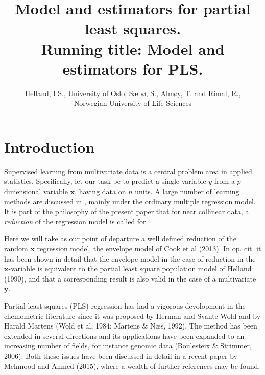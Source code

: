 \documentclass[11pt]{article}
\begin{document}
\title{Model and estimators for partial least squares.\\
  Running title: Model and estimators for PLS.}

\author{Helland, I.S., University of Oslo,  S\ae b\o , S., Alm\o y, T.  and Rimal, R.,\\
Norwegian University of Life Sciences}

\maketitle

\begin{abstract}

\end{abstract}

\onehalfspacing
\section{Introduction}

Supervised learning from multivariate data is a central problem area in applied statistics. Specifically, let our task be to predict a single variable $y$ from a $p$-dimensional  variable $\bm{x}$, having data on $n$ units. A large number of learning methods are discussed in \citet{hastie2009elements}, mainly under the ordinary multiple regression model. It is part of the philosophy of the present paper that for near collinear data, a \emph{reduction} of the regression model is called for.

Here we will take as our point of departure a well defined reduction of the random $\bm{x}$ regression model, the envelope model of \citet{cook2013envelopes} Cook et al (2013). In op. cit. it has been shown in detail that the envelope model in the case of reduction in the $\bm{x}$-variable is equivalent to the partial least square population model of \citet{helland1990partial} Helland (1990), and that a corresponding result is also valid in the case of a multivariate $\bm{y}$. 

Partial least squares (PLS) regression has had a vigorous devolopment in the chemometric literature since it was proposed by  Herman and Svante Wold and by Harald Martens \citep{wold1984collinearity, martens1992multivariate} (Wold et al, 1984; Martens \& N\ae s, 1992). The method has been extended in several directions and its applications have been expanded to an increasing number of fields, for instance genomic data (Boulesteix \& Strimmer, 2006). Both these issues have been discussed in detail in a recent paper by Mehmood and Ahmed (2015), where a wealth of further references may be found.
\end{document}
